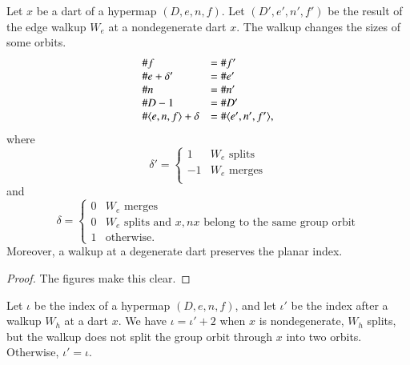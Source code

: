 \begin{lemma} Let $x$ be a dart of a hypermap $(D,e,n,f)$. Let $(D',e',n',f')$ be the result of the edge walkup $W_e$ at
a nondegenerate dart $x$.  
The walkup changes the sizes of some orbits.
    $$
    \begin{array}{lll}
    \# f &= \# f'\\  
    \# e + \delta' &= \# e'\\
    \# n &= \# n'\\
    \# D - 1&= \# D' \\
    \# \langle e,n,f\rangle + \delta&= \#\langle e',n',f'\rangle,\\
    \end{array}
    $$
where
   $$
   \delta' = \begin{cases}
     1 & W_e \text{ splits }\\
    -1 & W_e \text{ merges}\\
   \end{cases}
   $$
and
   $$
   \delta = \begin{cases}
    0 & W_e \text{ merges }\\
    0 & W_e \text{ splits and } x,nx 
      \text{ belong to the same group orbit}\\
    1 & \text{otherwise}.
     \end{cases}
   $$
Moreover, a walkup at a degenerate dart preserves the planar index.
\end{lemma}

\begin{proof} The figures make this clear.
\end{proof}

\begin{lemma}
Let $\iota$ be the index of a  hypermap $(D,e,n,f)$, and
let $\iota'$ be the index after a walkup $W_h$
at a dart $x$.  We have $\iota = \iota' + 2$ when
$x$ is nondegenerate, $W_h$ splits, but the walkup does not
split the group orbit through $x$ into two orbits.
Otherwise, $\iota'=\iota$.
\end{lemma} 




